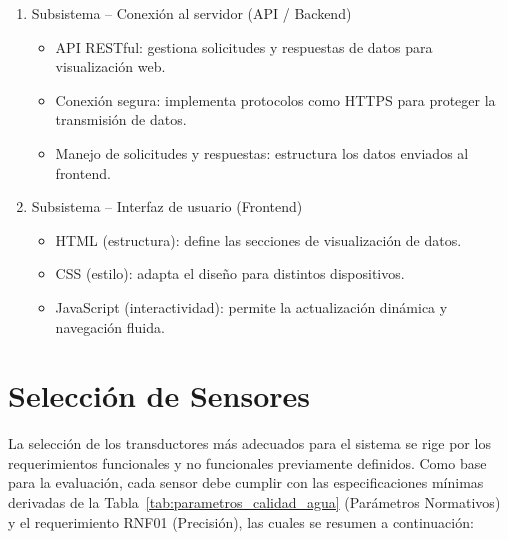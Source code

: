 \begin{enumerate}
    \item Subsistema – Conexión al servidor (API / Backend)
    \begin{itemize}
        \item API RESTful: gestiona solicitudes y respuestas de datos para visualización web.
        \item Conexión segura: implementa protocolos como HTTPS para proteger la transmisión de datos.
        \item Manejo de solicitudes y respuestas: estructura los datos enviados al frontend.
    \end{itemize}

    \item Subsistema – Interfaz de usuario (Frontend)
    \begin{itemize}
        \item HTML (estructura): define las secciones de visualización de datos.
        \item CSS (estilo): adapta el diseño para distintos dispositivos.
        \item JavaScript (interactividad): permite la actualización dinámica y navegación fluida.
    \end{itemize}
\end{enumerate}





%





\section{Selección de Sensores}
\label{sec:analisis_sensores}
La selección de los transductores más adecuados para el sistema se rige por los requerimientos funcionales y no funcionales previamente definidos. Como base para la evaluación, cada sensor debe cumplir con las especificaciones mínimas derivadas de la Tabla~\ref{tab:parametros_calidad_agua} (Parámetros Normativos) y el requerimiento RNF01 (Precisión), las cuales se resumen a continuación:

